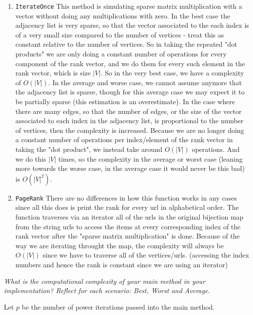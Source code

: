 \documentclass[11pt]{article}
\begin{document}
\begin{enumerate}
  \item \texttt{IterateOnce} This method is simulating sparse matrix multiplication with a vector without doing any multiplications with zero. In the best case the adjacency list is very sparse, so that the vector associated to the each index is of a very small size compared to the number of vertices - treat this as constant relative to the number of vertices. So in taking the repeated "dot products" we are only doing a constant number of operations for every component of the rank vector, and we do them for every such element in the rank vector, which is size $|V|$. So in the very best case, we have a complexity of $O(|V|)$. In the average and worse case, we cannot assume anymore that the adjacency list is sparse, though for this average case we may expect it to be partially sparse (this estimation is an overestimate). In the case where there are many edges, so that the number of edges, or the size of the vector associated to each index in the adjacency list, is proportional to the number of vertices, then the complexity is increased. Because we are no longer doing a constant number of operations per index/element of the rank vector in taking the "dot product", we instead take around $O(|V|)$ operations. And we do this $|V|$ times, so the complexity in the average or worst case (leaning more towards the worse case, in the average case it would never be this bad) is $O(|V|^2)$.
  \item \texttt{PageRank} There are no differences in how this function works in any cases since all this does is print the rank for every url in alphabetical order. The function traverses via an iterator all of the urls in the original bijection map from the string urls to access the items at every corresponding index of the rank vector after the "sparse matrix multiplication" is done. Because of the way we are iterating throught the map, the complexity will always be $O(|V|)$ since we have to traverse all of the vertices/urls. (accessing the index numbers and hence the rank is constant since we are using an iterator)
\end{enumerate}

\textit{What is the computational complexity of your main method in your implementation? Reflect for each scenario: Best, Worst and Average.}

Let $p$ be the number of power iterations passed into the main method.
\end{document}

